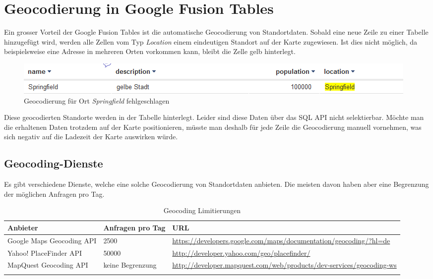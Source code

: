 \section{Geocodierung in Google Fusion Tables}
\label{gft-geocoding}
Ein grosser Vorteil der Google Fusion Tables ist die automatische 
\gls{Geocodierung} von Standortdaten. Sobald eine neue Zeile zu einer Tabelle hinzugefügt wird, werden alle Zellen vom Typ \emph{Location} einem eindeutigen Standort auf der Karte zugewiesen. Ist dies nicht möglich, da beispielsweise eine Adresse in mehreren Orten vorkommen kann, bleibt die Zelle gelb hinterlegt.

\begin{figure}[!ht]
	\centering
	\includegraphics[width=\textwidth]{images/einfuehrung/geocoding_failed}
	\caption{Geocodierung für Ort \emph{Springfield} fehlgeschlagen}
	\label{geocoding_failed}
\end{figure}

Diese geocodierten Standorte werden in der Tabelle hinterlegt. Leider sind diese Daten über das SQL \gls{API} nicht selektierbar. Möchte man die erhaltenen Daten trotzdem auf der Karte positionieren, müsste man deshalb für jede Zeile die \gls{Geocodierung} manuell vornehmen, was sich negativ auf die Ladezeit der Karte auswirken würde.

\subsection{Geocoding-Dienste}
Es gibt verschiedene Dienste, welche eine solche \gls{Geocodierung} von Standortdaten anbieten. Die meisten davon haben aber eine Begrenzung der möglichen Anfragen pro Tag.

\begin{longtable}{|p{0.4\threecelltabwidth}|p{0.14\threecelltabwidth}|p{0.46\threecelltabwidth}|}
\hline 
\textbf{Anbieter} & \textbf{Anfragen pro Tag} & \textbf{URL} \\ 
\hline 
Google Maps Geocoding \gls{API} & 2500 & \url{https://developers.google.com/maps/documentation/geocoding/?hl=de} \\ 
\hline 
Yahoo! PlaceFinder \gls{API} & 50000 & \url{http://developer.yahoo.com/geo/placefinder/} \\ 
\hline 
MapQuest Geocoding \gls{API} & keine Begrenzung & \url{http://developer.mapquest.com/web/products/dev-services/geocoding-ws} \\ 
\hline 
\caption{Geocoding Limitierungen}
\end{longtable} 

